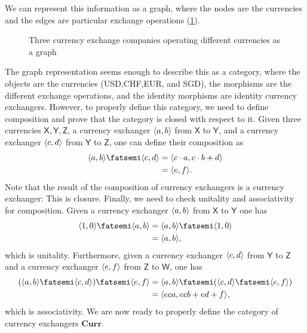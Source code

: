 We can represent this information as a graph, where the nodes are the currencies and the edges are particular exchange operations (\cref{fig:currencygraph}).

\begin{figure}[h]
\begin{center}
\end{center}
\caption{Three currency exchange companies operating different currencies as a graph \label{fig:currencygraph}}
\end{figure}

The graph representation seems enough to describe this as a category, where the objects are the currencies (USD,CHF,EUR, and SGD), the morphisms are the different exchange operations, and the identity morphisms are identity currency exchangers. However, to properly define this category, we need to define composition and prove that the category is closed with respect to it. Given three currencies $\mathsf{X,Y,Z}$, a currency exchanger $\langle a,b\rangle$ from $\mathsf{X}$ to $\mathsf{Y}$, and a currency exchanger $\langle c,d\rangle$ from $\mathsf{Y}$ to $\mathsf{Z}$, one can define their composition as
\begin{equation}
\begin{aligned}
\label{eq:currencycomp}
    \tup{a,b}\then \tup{c,d}&=\tup{c\cdot a,c\cdot b+d}\\
    &=\tup{e,f}.
\end{aligned}
\end{equation}
Note that the result of the composition of currency exchangers is a currency exchanger: This is closure. Finally, we need to check unitality and associativity for composition. Given a currency exchanger $\langle a,b\rangle$ from $\mathsf{X}$ to $\mathsf{Y}$ one has
\begin{equation}
    \begin{aligned}
    \tup{1,0}\then \tup{a,b}&=\tup{a,b}\then \tup{1,0}\\
    &=\tup{a,b},
    \end{aligned}
\end{equation}
which is unitality. Furthermore, given a currency exchanger $\langle c,d\rangle$ from $\mathsf{Y}$ to $\mathsf{Z}$ and a currency exchanger $\langle e,f\rangle$ from $\mathsf{Z}$ to $\mathsf{W}$, one has
\begin{equation}
    \begin{aligned}
    (\tup{a,b}\then \tup{c,d})\then \tup{e,f}&=\tup{a,b}\then( \tup{c,d}\then \tup{e,f})\\
    &=\tup{eca, ecb+ed+f},
    \end{aligned}
\end{equation}
which is associativity.
We are now ready to properly define the category of currency exchangers $\mathbf{Curr}$.

